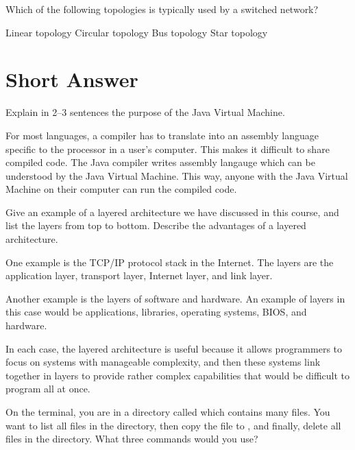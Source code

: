 \documentclass[answers,addpoints]{exam} %
\begin{document}
\begin{questions}
\question[2] Which of the following topologies is typically used by a switched network?
\begin{choices}
    \choice Linear topology
    \choice Circular topology
    \choice Bus topology
    \CorrectChoice Star topology
\end{choices}

\section{Short Answer}

\question[5] Explain in 2--3 sentences the purpose of the Java Virtual Machine.

\begin{solution}
For most languages, a compiler has to translate into an assembly language specific to the processor in a user's computer. This makes it difficult to share compiled code. The Java compiler writes assembly langauge which can be understood by the Java Virtual Machine. This way, anyone with the Java Virtual Machine on their computer can run the compiled code.
\end{solution}

\question[5] Give an example of a layered architecture we have discussed in this course, and list the layers from top to bottom. Describe the advantages of a layered architecture.

\begin{solution}
    One example is the TCP/IP protocol stack in the Internet. The layers are the application layer, transport layer, Internet layer, and link layer. 

    Another example is the layers of software and hardware. An example of layers in this case would be applications, libraries, operating systems, BIOS, and hardware.

    In each case, the layered architecture is useful because it allows programmers to focus on systems with manageable complexity, and then these systems link together in layers to provide rather complex capabilities that would be difficult to program all at once.
\end{solution}

\question[5] On the terminal, you are in a directory called  which contains many files. You want to list all files in the directory, then copy the file  to , and finally, delete all  files in the  directory. What three commands would you use?


\end{questions}
\end{document}
